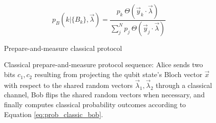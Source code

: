 \begin{equation}\label{eq:prob_classic_bob}
p_B(k|\{B_{k}\},\vec{\lambda}) = \frac{p_{k}\ \Theta(\vec{y}_{k} \cdot \vec{\lambda})}{\sum_{j}^{N}p_j\ \Theta(\vec{y}_j \cdot \vec{\lambda})}
\end{equation}

\begin{figure}[tb]
\begin{center}
\begin{msc}[msc keyword=, instance width=3.6cm]{Prepare-and-measure classical protocol}
\nextlevel[3]
\nextlevel[3]
\nextlevel[1]
\nextlevel[3]
\nextlevel[2]
\end{msc}
\end{center}
\caption{Classical prepare-and-measure protocol sequence: Alice sends two bits $c_1, c_2$ resulting from projecting the qubit state's Bloch vector $\vec{x}$ with respect to the shared random vectors $\vec{\lambda}_1, \vec{\lambda}_2$ through a classical channel, Bob flips the shared random vectors when necessary, and finally computes classical probability outcomes according to Equation \ref{eq:prob_classic_bob}.}
\label{fig:msc_pm}
\end{figure}



